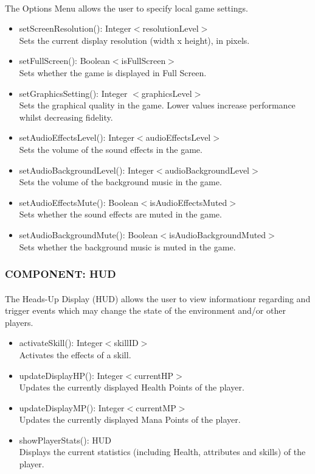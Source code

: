 \documentclass[12pt, titlepage]{article}
\begin{document}
\paragraph{}The Options Menu allows the user to specify local game settings.
\begin{itemize}
    \item setScreenResolution(): Integer$<$resolutionLevel$>$ \\ Sets the current display resolution (width x height), in pixels.
    \item setFullScreen(): Boolean$<$isFullScreen$>$ \\ Sets whether the game is displayed in Full Screen.
    \item setGraphicsSetting(): Integer $<$graphicsLevel$>$ \\ Sets the graphical quality in the game. Lower values increase performance whilst decreasing fidelity.
    \item setAudioEffectsLevel(): Integer$<$audioEffectsLevel$>$ \\ Sets the volume of the sound effects in the game.
    \item setAudioBackgroundLevel(): Integer$<$audioBackgroundLevel$>$  \\ Sets the volume of the background music in the game.
    \item setAudioEffectsMute(): Boolean$<$isAudioEffectsMuted$>$  \\ Sets whether the sound effects are muted in the game.
    \item setAudioBackgroundMute(): Boolean$<$isAudioBackgroundMuted$>$  \\ Sets whether the background music is muted in the game.
\end{itemize}
\subsubsection{COMPONENT: HUD}
\paragraph{}The Heads-Up Display (HUD) allows the user to view informationr regarding and trigger events which may change the state of the environment and/or other players.
\begin{itemize}
    \item activateSkill(): Integer$<$skillID$>$ \\ Activates the effects of a skill.
    \item updateDisplayHP(): Integer$<$currentHP$>$  \\ Updates the currently displayed Health Points of the player.
    \item updateDisplayMP(): Integer$<$currentMP$>$  \\ Updates the currently displayed Mana Points of the player.
    \item showPlayerStats(): HUD \\ Displays the current statistics (including Health, attributes and skills) of the player.
\end{itemize}
\end{document}
